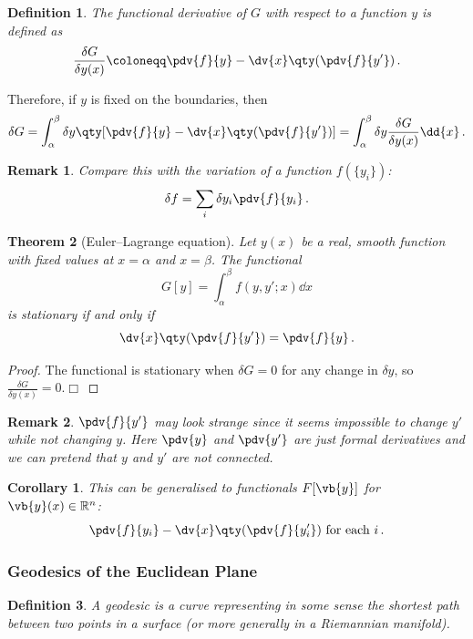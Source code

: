 \documentclass{article}
\theoremstyle{plain}\theoremheaderfont{\normalfont\itshape}\theorembodyfont{\rmfamily}\theoremseparator{.}\newtheorem*{rem}{Remark}\newtheorem*{ex}{Example}\newtheorem*{proof}{Proof}\newtheorem*{altp}{Alternative proof}
\theoremstyle{plain}\theoremheaderfont{\normalfont\bfseries}\theorembodyfont{\rmfamily}\theoremseparator{.}\newtheorem{thm}{Theorem}[section]\newtheorem{lem}[thm]{Lemma}\newtheorem{prop}[thm]{Proposition}\newtheorem*{cor}{Corollary}\newtheorem{defn}[thm]{Definition}\newtheorem{clm}[thm]{Claim}\newtheorem{clminproof}{Claim}
\theoremstyle{break}\theoremheaderfont{\normalfont\itshape}\theorembodyfont{\rmfamily}\theoremseparator{.\medskip}\newtheorem*{proofskip}{Proof}\newtheorem*{exs}{Examples}\newtheorem*{rems}{Remarks}
\theoremstyle{break}\theoremheaderfont{\normalfont\bfseries}\theorembodyfont{\rmfamily}\theoremseparator{.\medskip}\newtheorem{lemskip}[thm]{Lemma}\newtheorem{defnskip}[thm]{Definition}\newtheorem{propskip}[thm]{Proposition}\newtheorem{thmskip}[thm]{Theorem}
\numberwithin{equation}{section}
\newcommand{\qed}{\hfill\ensuremath{\Box}}
\begin{document}
	\begin{defn}
		The \textit{functional derivative} of \(G\) with respect to a function \(y\) is defined as
		\[\frac{\delta G}{\delta y(x)}\coloneqq\pdv{f}{y}-\dv{x}\qty(\pdv{f}{y'})\,.\]
	\end{defn}

	Therefore, if \(y\) is fixed on the boundaries, then
	\[\delta G=\int_{\alpha}^{\beta}\delta y\qty[\pdv{f}{y}-\dv{x}\qty(\pdv{f}{y'})]=\int_{\alpha}^{\beta}\delta y\frac{\delta G}{\delta y(x)}\dd{x}\,.\]

	\begin{rem}
		Compare this with the variation of a function \(f(\{y_i\})\):
		\[\delta f=\sum_i \delta y_i\pdv{f}{y_i}\,.\]
	\end{rem}

	\begin{thm}[Euler--Lagrange equation]		
		Let \(y(x)\) be a real, smooth function with fixed values at \(x=\alpha\) and \(x=\beta\). The functional
		\begin{equation}\tag{\(\dagger\)}
			G[y]=\int_{\alpha}^{\beta}f(y,y';x)\dd{x}
		\end{equation}
		is stationary if and only if
		\[\dv{x}\qty(\pdv{f}{y'})=\pdv{f}{y}\,.\]
	\end{thm}
	\begin{proof}
		The functional is stationary when \(\delta G=0\) for any change in \(\delta y\), so \(\frac{\delta G}{\delta y(x)}=0\).\qed
	\end{proof}
	\begin{rem}
		\(\pdv{f}{y'}\) may look strange since it seems impossible to change \(y'\) while not changing \(y\). Here \(\pdv{y}\) and \(\pdv{y'}\) are just formal derivatives and we can pretend that \(y\) and \(y'\) are not connected.
	\end{rem}
	\begin{cor}
		This can be generalised to functionals \(F[\vb{y}]\) for \(\vb{y}(x)\in\mathbb{R}^n\):
		\[\pdv{f}{y_i}-\dv{x}\qty(\pdv{f}{y'_i})\text{ for each }i\,.\]
	\end{cor}

	\subsubsection{Geodesics of the Euclidean Plane}
	\begin{defn}
		A \textit{geodesic} is a curve representing in some sense the shortest path between two points in a surface (or more generally in a \textit{Riemannian manifold}).
	\end{defn}
\end{document}
